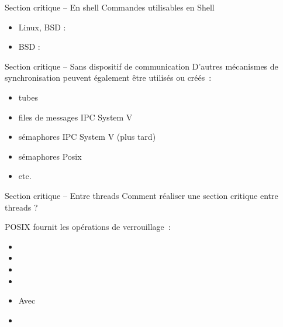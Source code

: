 \begin {frame} {Section critique -- En shell}
    Commandes utilisables en Shell
    \begin {itemize}
	\item Linux, BSD :


	\item BSD :

    \end {itemize}

\end {frame}

\begin {frame} {Section critique -- Sans dispositif de communication}
    D'autres mécanismes de synchronisation peuvent également être
    utilisés ou créés~:

    \begin {itemize}
	\item tubes
	\item files de messages IPC System V
	\item sémaphores IPC System V (plus tard)
	\item sémaphores Posix
	\item etc.
    \end {itemize}
\end {frame}

\begin {frame} {Section critique -- Entre threads}
    Comment réaliser une section critique entre threads ?

    POSIX fournit les opérations de verrouillage~:

    \begin {itemize}
	\item {}
	\item {}
	\item {}
	\item {}
	\item {}

	    Avec 
	\item {}
    \end {itemize}
\end {frame}

